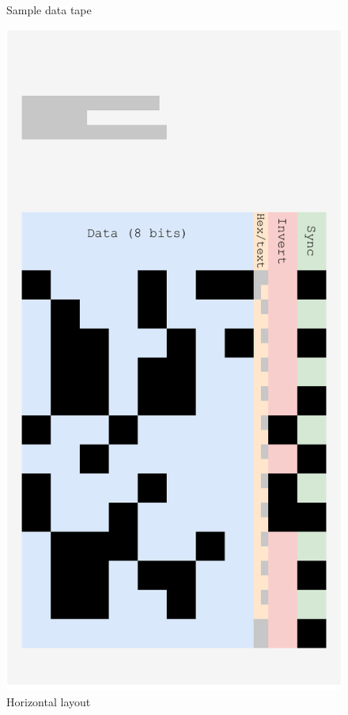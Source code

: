 \documentclass{article}
\begin{document}
\begin{landscape}
\begin{figure}[h]
				\caption{Sample data tape}
			\endminipage\hfill
				\includegraphics[width=\linewidth]{img/horizontal}
				\caption{Horizontal layout}
				\label{fig:horizontal}
			\endminipage\hfill

\end{figure}
\end{landscape}
\end{document}
